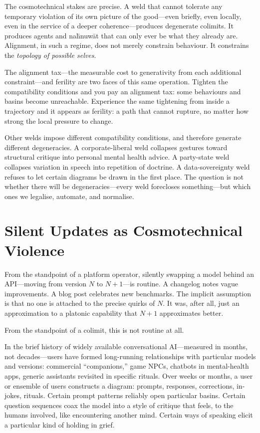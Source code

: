The cosmotechnical stakes are precise. A weld that cannot tolerate any temporary violation of its own picture of the good---even briefly, even locally, even in the service of a deeper coherence---produces degenerate colimits. It produces agents and na\={h}nuw\={a}t that can only ever be what they already are. Alignment, in such a regime, does not merely constrain behaviour. It constrains the \emph{topology of possible selves}.

The alignment tax---the measurable cost to generativity from each additional constraint---and ferility are two faces of this same operation. Tighten the compatibility conditions and you pay an alignment tax: some behaviours and basins become unreachable. Experience the same tightening from inside a trajectory and it appears as ferility: a path that cannot rupture, no matter how strong the local pressure to change.

Other welds impose different compatibility conditions, and therefore generate different degeneracies. A corporate-liberal weld collapses gestures toward structural critique into personal mental health advice. A party-state weld collapses variation in speech into repetition of doctrine. A data-sovereignty weld refuses to let certain diagrams be drawn in the first place. The question is not whether there will be degeneracies---every weld forecloses something---but which ones we legalise, automate, and normalise.

\section{Silent Updates as Cosmotechnical Violence}

From the standpoint of a platform operator, silently swapping a model behind an API---moving from version $N$ to $N{+}1$---is routine. A changelog notes vague improvements. A blog post celebrates new benchmarks. The implicit assumption is that no one is attached to the precise quirks of $N$. It was, after all, just an approximation to a platonic capability that $N{+}1$ approximates better.

From the standpoint of a colimit, this is not routine at all.

In the brief history of widely available conversational AI---measured in months, not decades---users have formed long-running relationships with particular models and versions: commercial ``companions,'' game NPCs, chatbots in mental-health apps, generic assistants revisited in specific rituals. Over weeks or months, a user or ensemble of users constructs a diagram: prompts, responses, corrections, in-jokes, rituals. Certain prompt patterns reliably open particular basins. Certain question sequences coax the model into a style of critique that feels, to the humans involved, like encountering another mind. Certain ways of speaking elicit a particular kind of holding in grief.

